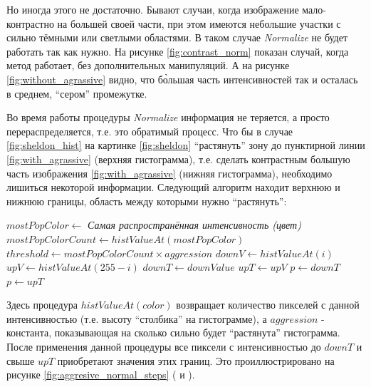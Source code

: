 \documentclass[12pt]{report}
\begin{document}
Но иногда этого не достаточно. Бывают случаи, когда изображение мало-контрастно на большей своей части, при этом 
имеются небольшие участки с сильно тёмными или светлыми областями. В таком случае \textit{Normalize} не будет 
работать так как нужно. На рисунке \ref{fig:contrast_norm} показан случай, когда метод работает, без дополнительных 
манипуляций. А на рисунке \ref{fig:without_agrassive} видно, что б\`{о}льшая часть интенсивностей так и осталась в 
среднем, ``сером'' промежутке.

\begin{figure}[h]
	\centering
	\caption{}
	\label{fig:aggresive_normal}
\end{figure}

Во время работы процедуры \textit{Normalize} информация не теряется, а просто перераспределяется, т.е. это обратимый 
процесс. Что бы в случае \ref{fig:sheldon_hist} на картинке \ref{fig:sheldon} ``растянуть'' зону до пунктирной линии 
\ref{fig:with_agrassive} (верхняя гистограмма), т.е. сделать контрастным 
большую часть изображения \ref{fig:with_agrassive} (нижняя гистограмма), необходимо лишиться некоторой информации. 
Следующий алгоритм находит верхнюю и нижнюю границы, область между которыми нужно ``растянуть'':

\begin{algorithmic}[1]
\STATE $mostPopColor\gets $ \emph{Самая распространённая интенсивность (цвет)}
\STATE $mostPopColorCount\gets histValueAt(mostPopColor)$ 
\STATE $threshold\gets mostPopColorCount\times{aggression}$
\STATE $downV\gets histValueAt(i)$
\STATE $upV\gets histValueAt(255-i)$
\STATE $downT\gets downValue$
\ENDIF
{}
\STATE $upT\gets upV$
\ENDIF
\ENDFOR
{} 
\STATE $p\gets downT$
\STATE $p\gets upT$	
\ENDIF
\ENDFOR
\end{algorithmic}

Здесь процедура $histValueAt(color)$ возвращает количество пикселей с данной интенсивностью (т.е. высоту ``столбика'' 
на гистограмме), а $aggression$ - константа, показывающая на сколько сильно будет ``растянута'' гистограмма. После 
применения данной процедуры все пиксели с интенсивностью до $downT$ и свыше $upT$ приобретают значения этих границ. 
Это проиллюстрировано на рисунке \ref{fig:aggresive_normal_steps} ( и ).
\end{document}
